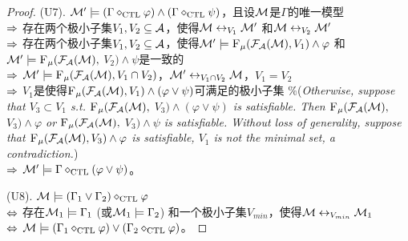 \begin{proof}
	
	
	(U7). ${\cal M}' \models (\Gamma \diamond_{\textrm{CTL}} \varphi) \wedge (\Gamma \diamond_{\textrm{CTL}} \psi)$，且设${\cal M}$是$\Gamma$的唯一模型\\
	$\Rightarrow$ 存在两个极小子集$V_1, V_2 \subseteq {\cal A}$，使得${\cal M} \leftrightarrow_{V_1} {\cal M}'$ 和${\cal M} \leftrightarrow_{V_2} {\cal M}'$\\
	$\Rightarrow$ 存在两个极小子集$V_1, V_2 \subseteq {\cal A}$，使得${\cal M}' \models {\textsc{F}_{\textsc{$\mu$}}}({\cal F}_{{\cal A}}({\cal M}), V_1) \wedge \varphi$ 和 ${\cal M}' \models {\textsc{F}_{\textsc{$\mu$}}}({\cal F}_{{\cal A}}({\cal M}),$ $V_2) \wedge \psi$是一致的\\
	$\Rightarrow$ ${\cal M}' \models {\textsc{F}_{\textsc{$\mu$}}}({\cal F}_{{\cal A}}({\cal M}), V_1 \cap V_2)$，${\cal M}' \leftrightarrow_{V_1 \cap V_2} {\cal M}$，$V_1 = V_2$\\
	$\Rightarrow$  $V_1$是使得${\textsc{F}_{\textsc{$\mu$}}}({\cal F}_{{\cal A}}({\cal M}), V_1) \wedge (\varphi \vee \psi)$可满足的极小子集 \qquad  \textcolor[RGB]{0,134,139}{$\%$({\em Otherwise, suppose that $V_3\subset V_1$ s.t. ${\textsc{F}_{\textsc{$\mu$}}}({\cal F}_{{\cal A}}({\cal M}),$ $V_3) \wedge (\varphi \vee \psi)$ is satisfiable. Then ${\textsc{F}_{\textsc{$\mu$}}}({\cal F}_{{\cal A}}({\cal M}),$ $V_3) \wedge \varphi$ or ${\textsc{F}_{\textsc{$\mu$}}}({\cal F}_{{\cal A}}({\cal M}),$ $V_3) \wedge \psi$ is satisfiable. Without loss of generality, suppose that ${\textsc{F}_{\textsc{$\mu$}}}({\cal F}_{{\cal A}}({\cal M}), V_3) \wedge \varphi$ is satisfiable, $V_1$ is not the minimal set, a contradiction.})}\\
	$\Rightarrow$ ${\cal M}' \models \Gamma \diamond_{\textrm{CTL}} (\varphi \vee \psi)$。
	
	
	
	(U8). ${\cal M} \models (\Gamma_1 \vee \Gamma_2) \diamond_{\textrm{CTL}} \varphi$ \\
	$\Leftrightarrow$ 存在${\cal M}_1 \models \Gamma_1$ (或${\cal M}_1 \models \Gamma_2$) 和一个极小子集$V_{min}$，使得${\cal M} \leftrightarrow_{V_{min}} {\cal M}_1$\\
	$\Leftrightarrow$ ${\cal M} \models (\Gamma_1 \diamond_{\textrm{CTL}} \varphi) \vee (\Gamma_2 \diamond_{\textrm{CTL}} \varphi)$。
\end{proof}


